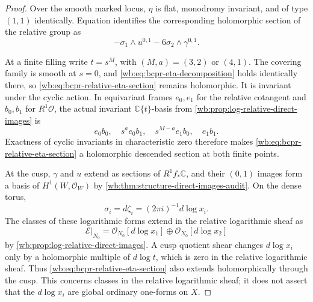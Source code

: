 \begin{proof}
Over the smooth marked locus, $\eta$ is flat, monodromy invariant, and of
type $(1,1)$ identically.  Equation
 identifies the corresponding holomorphic
section of the relative group as
\begin{equation}
 -\sigma_1\wedge u^{0,1}-6\sigma_2\wedge\gamma^{0,1}.
\label{wb:eq:bcpr-relative-eta-section}
\end{equation}

At a finite filling write $t=s^M$, with $(M,a)=(3,2)$ or $(4,1)$.
The covering family is smooth at $s=0$, and
\cref{wb:eq:bcpr-eta-decomposition} holds identically there, so
\cref{wb:eq:bcpr-relative-eta-section} remains holomorphic.  It is invariant
under the cyclic action.  In equivariant frames $e_0,e_1$ for the relative
cotangent and $b_0,b_1$ for $R^1\mathcal O$, the actual invariant
$\mathbb C\{t\}$-basis from
\cref{wb:prop:log-relative-direct-images} is
\begin{equation}
 e_0b_0,\quad s^ae_0b_1,\quad
 s^{M-a}e_1b_0,\quad e_1b_1.
\label{wb:eq:bcpr-finite-invariant-basis}
\end{equation}
Exactness of cyclic invariants in characteristic zero therefore makes
\cref{wb:eq:bcpr-relative-eta-section} a holomorphic descended section at
both finite points.

At the cusp, $\gamma$ and $u$ extend as sections of $R^1f_*\mathbb C$,
and their $(0,1)$ images form a basis of $H^1(W,\mathcal O_W)$ by
\cref{wb:thm:structure-direct-images-audit}.  On the dense torus,
\[
 \sigma_i=d\zeta_i=(2\pi i)^{-1}d\log x_i.
\]
The classes of these logarithmic forms extend in the relative logarithmic
sheaf as
\begin{equation}
 \mathcal E|_{N_0}
 =\mathcal O_{N_0}[d\log x_1]\oplus
  \mathcal O_{N_0}[d\log x_2]
\label{wb:eq:bcpr-cusp-log-basis}
\end{equation}
by \cref{wb:prop:log-relative-direct-images}.  A cusp quotient shear changes
$d\log x_i$ only by a holomorphic multiple of $d\log t$, which is zero in
the relative logarithmic sheaf.  Thus
\cref{wb:eq:bcpr-relative-eta-section} also extends holomorphically through
the cusp.  This concerns classes in the relative logarithmic sheaf; it
does not assert that the $d\log x_i$ are global ordinary one-forms on $X$.


\end{proof}
